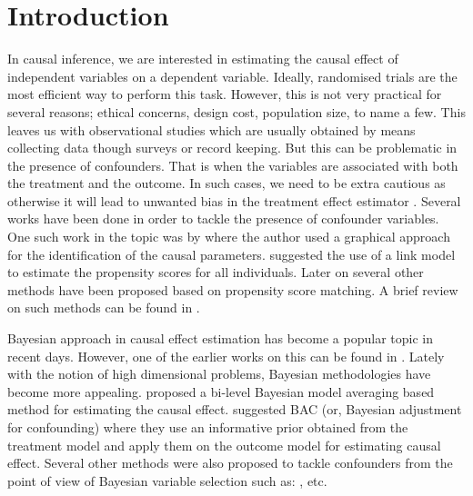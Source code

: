 \documentclass{amsart}
\begin{document}
\section{Introduction}\label{sec:intro}

In causal inference, we are interested in estimating the causal
effect of independent variables on a dependent variable. Ideally,
randomised trials are the most efficient way to perform this task.
However, this is not very practical for several reasons; ethical 
concerns, design cost, population size, to name a few. This
leaves us with observational studies which are usually obtained
by means collecting data though surveys or record keeping. But this
can be problematic in the presence of confounders. That is when
the variables are associated with both the treatment and the outcome.
In such cases, we need to be extra cautious as otherwise it will
lead to unwanted bias in the treatment effect estimator \cite{rosenbaum83}.
Several works have been done in order to tackle the presence of
confounder variables. One such work in the topic was 
by \citet{Robins1986ANA} where the author used  a graphical
approach for the identification of the causal parameters.
\citet{rosenbaum1985} suggested the use of a link model to estimate
the propensity scores for all individuals. Later on several other
methods have been proposed based on propensity score matching.
A brief review on such methods can be found in \cite{winship99, stuart10}.

Bayesian approach in causal effect estimation has become a popular
topic in recent days. However, one of the earlier works on this can be
found in \cite{rubin1978}. Lately with the notion of high dimensional problems, Bayesian methodologies have become
more appealing. \citet{Crainiceanu2008} proposed a bi-level 
Bayesian model averaging based method for estimating the causal 
effect. \citet{wang2015} suggested BAC (or, Bayesian adjustment for
confounding) where they use an informative prior obtained from
the treatment model and apply them on the outcome model for
estimating causal effect. Several other methods were also
proposed to tackle confounders from the point of view of Bayesian
variable selection such as: \citet{Zigler2014}, \citet{Hahn2018} etc.
\end{document}
